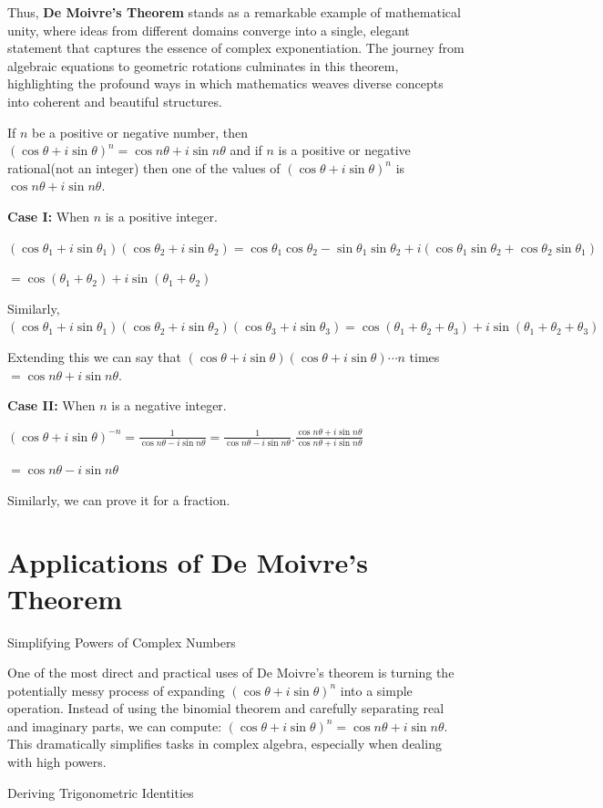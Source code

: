Thus, {\bf De Moivre's Theorem} stands as a remarkable example of mathematical unity, where ideas from
different domains converge into a single, elegant statement that captures the essence of complex
exponentiation. The journey from algebraic equations to geometric rotations culminates in this theorem,
highlighting the profound ways in which mathematics weaves diverse concepts into coherent and beautiful
structures.

\starttheorem
If $n$ be a positive or negative number, then $(\cos\theta + i\sin\theta)^n = \cos n\theta + i\sin n\theta$
and if $n$ is a positive or negative rational(not an integer) then one of the values of $(\cos\theta +
i\sin\theta)^n$ is $\cos n\theta + i\sin n\theta$.
\stoptheorem

\startproof
{\bf Case I:} When $n$ is a positive integer.

$\left(\cos\theta_1 + i\sin\theta_1\right)\left(\cos\theta_2 + i\sin\theta_2\right) = \cos\theta_1\cos\theta_2 -
\sin\theta_1\sin\theta_2 + i\left(\cos\theta_1\sin\theta_2 + \cos\theta_2\sin\theta_1\right)$

$= \cos\left(\theta_1 + \theta_2\right) + i\sin\left(\theta_1 + \theta_2\right)$

Similarly, $\left(\cos\theta_1 + i\sin\theta_1\right)\left(\cos\theta_2 +
  i\sin\theta_2\right)\left(\cos\theta_3 + i\sin\theta_3\right) = \cos\left(\theta_1 + \theta_2 +
  \theta_3\right) + i\sin\left(\theta_1 + \theta_2 + \theta_3\right)$

Extending this we can say that $(\cos\theta + i\sin\theta)(\cos\theta + i\sin\theta) \cdots n$ times $= \cos
n\theta + i\sin n\theta$.

{\bf Case II:} When $n$ is a negative integer.

$(\cos\theta + i\sin\theta)^{-n} = \frac{1}{\cos n\theta - i\sin n\theta} = \frac{1}{\cos n\theta - i\sin
  n\theta}.\frac{\cos n\theta + i\sin n\theta}{\cos n\theta + i\sin n\theta}$

$= \cos n\theta - i\sin n\theta$

Similarly, we can prove it for a fraction.
\stopproof

\section{Applications of De Moivre's Theorem}
\startitemize[n]
\item Simplifying Powers of Complex Numbers

  One of the most direct and practical uses of De Moivre’s theorem is turning the potentially messy process
  of expanding $(\cos\theta + i\sin\theta)^n$ into a simple operation. Instead of using the binomial theorem
  and carefully separating real and imaginary parts, we can compute: $(\cos\theta + i\sin\theta)^n = \cos
  n\theta + i\sin n\theta$. This dramatically simplifies tasks in complex algebra, especially when dealing
  with high powers.
\item Deriving Trigonometric Identities

